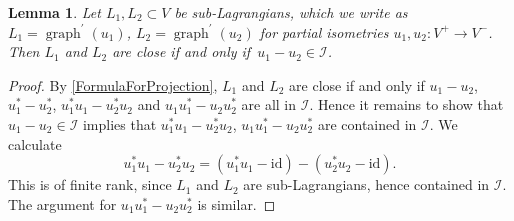 \documentclass[pdftex]{sigma}
\numberwithin{equation}{section}
\newtheorem{Lemma}[Theorem]{Lemma}
\DeclareMathOperator{\graph}{\mathrm{graph}}
\newcommand{\id}{\mathrm{id}}
\begin{document}
\begin{Lemma} \label{LemmaClosenessForUnitaries}
Let $L_1, L_2 \subset V$ be sub-Lagrangians, which we write as $L_1 = \graph^\prime(u_1)$, $L_2 = \graph^\prime(u_2)$ for partial isometries $u_1, u_2\colon V^+ \to V^-$.
Then $L_1$ and $L_2$ are close if and only if~${u_1 - u_2 \in \mathcal{I}}$.
\end{Lemma}

\begin{proof}
By \eqref{FormulaForProjection}, $L_1$ and $L_2$ are close if and only if $u_1 - u_2$, $u_1^* - u_2^*$, $u_1^*u_1 - u_2^* u_2$ and $u_1 u_1^* - u_2 u_2^*$ are all in $\mathcal{I}$.
Hence it remains to show that $u_1 - u_2 \in \mathcal{I}$ implies that $u_1^*u_1 - u_2^* u_2$, $u_1 u_1^* - u_2 u_2^*$ are contained in $\mathcal{I}$.
We calculate
\begin{equation*}
u_1^* u_1 - u_2^* u_2 = (u_1^*u_1 - \id) - (u_2^* u_2 - \id).
\end{equation*}
This is of finite rank, since $L_1$ and $L_2$ are sub-Lagrangians, hence contained in $\mathcal{I}$.
The argument for $u_1 u_1^* - u_2 u_2^*$ is similar.
\end{proof}
\end{document}
